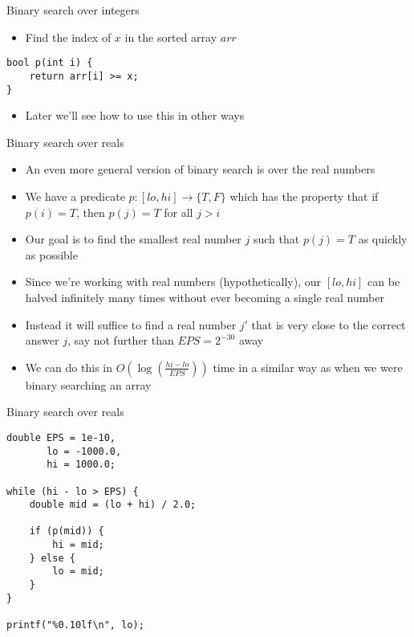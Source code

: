 \documentclass[12pt,t]{beamer}
\newcommand{\bi}{\begin{itemize}}
\newcommand{\ei}{\end{itemize}}
\begin{document}
\begin{frame}[fragile]{Binary search over integers}
    \bi
        \item Find the index of $x$ in the sorted array $arr$
    \ei
    \begin{verbatim}
bool p(int i) {
    return arr[i] >= x;
}
    \end{verbatim}

    \vspace{20pt}
    \bi
        \item Later we'll see how to use this in other ways
    \ei
\end{frame}

\begin{frame}[fragile]{Binary search over reals}
    \bi
        \item An even more general version of binary search is over the real numbers
        \item We have a predicate $p : [lo,hi] \rightarrow \{T, F\}$ which has the property that if $p(i) = T$, then $p(j) = T$ for all $j > i$
        \item Our goal is to find the smallest real number $j$ such that $p(j) = T$ as quickly as possible

        \vspace{5pt}
        \item Since we're working with real numbers (hypothetically), our $[lo,hi]$ can be halved infinitely many times without ever becoming a single real number
        \item Instead it will suffice to find a real number $j'$ that is very close to the correct answer $j$, say not further than $EPS = 2^{-30}$ away

        \vspace{5pt}
    \item We can do this in $O(\log(\frac{hi - lo}{EPS}))$ time in a similar way as when we were binary searching an array
    \ei
\end{frame}

\begin{frame}[fragile]{Binary search over reals}
    \begin{verbatim}
double EPS = 1e-10,
       lo = -1000.0,
       hi = 1000.0;

while (hi - lo > EPS) {
    double mid = (lo + hi) / 2.0;

    if (p(mid)) {
        hi = mid;
    } else {
        lo = mid;
    }
}

printf("%0.10lf\n", lo);
    \end{verbatim}
\end{frame}
\end{document}
